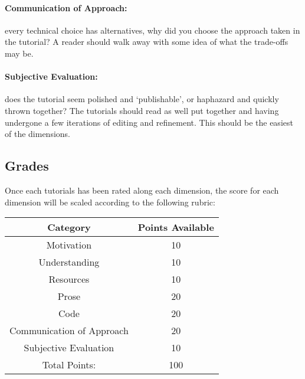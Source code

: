 \documentclass{article}
\begin{document}
\paragraph{Communication of Approach:} every technical choice has alternatives,
  why did you choose the approach taken in the tutorial? A reader should walk
  away with some idea of what the trade-offs may be.

\paragraph{Subjective Evaluation:} does the tutorial seem polished and
  `publishable', or haphazard and quickly thrown together? The tutorials
  should read as well put together and having undergone a few iterations of
  editing and refinement. This should be the easiest of the dimensions.

\subsection{Grades}

Once each tutorials has been rated along each dimension, the score for
each dimension will be scaled according to the following rubric:

\vspace{\fill}

\begin{center}
\begin{tabular}{c|c}\toprule
Category                  & Points Available \\ \midrule
Motivation                & 10 \\
Understanding             & 10 \\
Resources                 & 10 \\
Prose                     & 20 \\
Code                      & 20 \\
Communication of Approach & 20 \\
Subjective Evaluation     & 10 \\ \midrule
Total Points:             & 100
\end{tabular}
\end{center}
\end{document}
